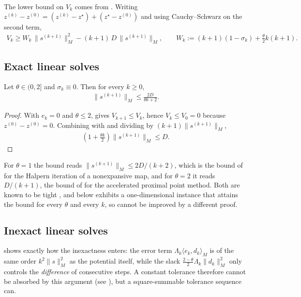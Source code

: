 The lower bound on $V_k$ comes from .
Writing $z^{(k)} - z^{(0)} = (z^{(k)} - z^\star) + (z^\star - z^{(0)})$ and using Cauchy--Schwarz on the second term,
\begin{align}
    V_k \ge W_k\, \|s^{(k+1)}\|_M^2 - (k+1)\, D\, \|s^{(k+1)}\|_M,
    \qquad W_k := (k+1)(1 - \sigma_k) + \frac{\theta}{2}k(k+1). \label{eq:acc-potential-lower}
\end{align}

\subsection{Exact linear solves}
\begin{theorem}\label{thm:acc-exact}
    Let $\theta \in (0,2]$ and $\sigma_k \equiv 0$.
    Then for every $k \ge 0$,
    \begin{align}
        \|s^{(k+1)}\|_M \le \frac{2D}{\theta k + 2}.
    \end{align}
\end{theorem}
\begin{proof}
    With $e_k = 0$ and $\theta \le 2$,  gives $V_{k+1} \le V_k$, hence $V_k \le V_0 = 0$ because $z^{(0)} - z^{(0)} = 0$.
    Combining with  and dividing by $(k+1)\|s^{(k+1)}\|_M$,
    \begin{align}
        \left(1 + \frac{\theta k}{2}\right)\|s^{(k+1)}\|_M \le D.
    \end{align}
\end{proof}

For $\theta = 1$ the bound reads $\|s^{(k+1)}\|_M \le 2D/(k+2)$, which is the bound of \citet{lieder2021halpern} for the Halpern iteration of a nonexpansive map, and for $\theta = 2$ it reads $D/(k+1)$, the bound of \citet{kim2021accelerated} for the accelerated proximal point method.
Both are known to be tight \citep{park2022exact}, and  below exhibits a one-dimensional instance that attains the bound for every $\theta$ and every $k$, so  cannot be improved by a different proof.

\subsection{Inexact linear solves}
 shows exactly how the inexactness enters: the error term $\Lambda_k\langle e_k, d_k\rangle_M$ is of the same order $k^2\|s\|_M^2$ as the potential itself, while the slack $\frac{2-\theta}{2}\Lambda_k\|d_k\|_M^2$ only controls the \emph{difference} of consecutive steps.
A constant tolerance therefore cannot be absorbed by this argument (see ), but a square-summable tolerance sequence can.

